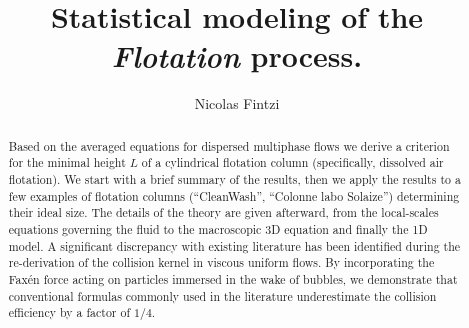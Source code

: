 \documentclass[12pt]{My_preprint}
\title{
    Statistical modeling of the \textit{Flotation} process.  
    }
\author[1,2]{Nicolas Fintzi}
\begin{document}
\maketitle


\begin{abstract}
    Based on the averaged equations for dispersed multiphase flows \citep{jackson2000} we derive a criterion for the minimal height $L$ of a cylindrical flotation column (specifically, dissolved air flotation). 
    We start with a brief summary of the results, then we apply the results to a few examples of flotation columns (``CleanWash'', ``Colonne labo Solaize'') determining their ideal size. 
    The details of the theory are given afterward, from the local-scales equations governing the fluid to the macroscopic 3D equation and finally the 1D model.
    A significant discrepancy with existing literature has been identified during the re-derivation of the collision kernel in viscous uniform flows.
    By incorporating the Faxén force acting on particles immersed in the wake of bubbles, we demonstrate that conventional formulas commonly used in the literature \citep{loewenberg1994flotation} underestimate the collision efficiency by a factor of  $1/4$.   
\end{abstract}
\tableofcontents
\newpage


% 




\appendix

\end{document}
